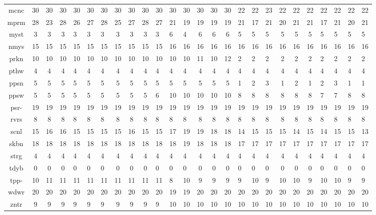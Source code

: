 \begin{center}
\begin{tabular}{|c|cccHHH|cccHHH|cccHHH|cccHHH|}
mcnc & 30 & 30 & 30 & 30 & 30 & 30 & 30 & 30 & 30 & 30 & 30 & 30 & 30 & 30 & 30 & 22 & 22 & 23 & 22 & 22 & 22 & 22 & 22 & 22 & 22\\
mprm & 28 & 23 & 28 & 26 & 27 & 28 & 25 & 27 & 28 & 27 & 21 & 19 & 19 & 19 & 19 & 21 & 17 & 21 & 20 & 21 & 21 & 17 & 21 & 20 & 21\\
myst & 3 & 3 & 3 & 3 & 3 & 3 & 3 & 3 & 3 & 3 & 6 & 4 & 6 & 6 & 6 & 5 & 5 & 5 & 5 & 5 & 5 & 5 & 5 & 5 & 5\\
nmys & 15 & 15 & 15 & 15 & 15 & 15 & 15 & 15 & 15 & 15 & 16 & 16 & 16 & 16 & 16 & 16 & 16 & 16 & 16 & 16 & 16 & 16 & 16 & 16 & 16\\
prkn & 10 & 10 & 10 & 10 & 10 & 10 & 10 & 10 & 10 & 10 & 10 & 10 & 11 & 10 & 12 & 2 & 2 & 2 & 2 & 2 & 2 & 2 & 2 & 2 & 2\\
pthw & 4 & 4 & 4 & 4 & 4 & 4 & 4 & 4 & 4 & 4 & 4 & 4 & 4 & 4 & 4 & 4 & 4 & 4 & 4 & 4 & 4 & 4 & 4 & 4 & 4\\
ppsn & 5 & 5 & 5 & 5 & 5 & 5 & 5 & 5 & 5 & 5 & 5 & 5 & 5 & 5 & 5 & 1 & 2 & 3 & 1 & 2 & 1 & 2 & 3 & 1 & 1\\
ppsw & 5 & 5 & 5 & 5 & 5 & 5 & 5 & 5 & 5 & 6 & 10 & 10 & 10 & 10 & 10 & 8 & 8 & 8 & 8 & 8 & 8 & 7 & 7 & 8 & 8\\
psr- & 19 & 19 & 19 & 19 & 19 & 19 & 19 & 19 & 19 & 19 & 19 & 19 & 19 & 19 & 19 & 19 & 19 & 19 & 19 & 19 & 19 & 19 & 19 & 19 & 19\\
rvrs & 8 & 8 & 8 & 8 & 8 & 8 & 8 & 8 & 8 & 8 & 8 & 8 & 8 & 8 & 8 & 8 & 8 & 8 & 8 & 8 & 8 & 8 & 8 & 8 & 8\\
scnl & 15 & 16 & 16 & 15 & 15 & 15 & 15 & 16 & 15 & 15 & 17 & 19 & 19 & 18 & 18 & 14 & 15 & 15 & 15 & 14 & 15 & 14 & 15 & 15 & 13\\
skbn & 18 & 18 & 18 & 18 & 18 & 18 & 18 & 18 & 18 & 18 & 18 & 19 & 18 & 18 & 18 & 17 & 17 & 17 & 17 & 17 & 17 & 17 & 17 & 17 & 17\\
strg & 4 & 4 & 4 & 4 & 4 & 4 & 4 & 4 & 4 & 4 & 4 & 4 & 4 & 4 & 4 & 4 & 4 & 4 & 4 & 4 & 4 & 4 & 4 & 4 & 4\\
tdyb & 0 & 0 & 0 & 0 & 0 & 0 & 0 & 0 & 0 & 0 & 0 & 0 & 0 & 0 & 0 & 0 & 0 & 0 & 0 & 0 & 0 & 0 & 0 & 0 & 0\\
tpp- & 10 & 11 & 11 & 11 & 11 & 11 & 11 & 11 & 11 & 11 & 8 & 10 & 9 & 9 & 9 & 9 & 10 & 9 & 10 & 10 & 9 & 10 & 10 & 9 & 9\\
wdwr & 20 & 20 & 20 & 20 & 20 & 20 & 20 & 20 & 20 & 20 & 19 & 19 & 20 & 20 & 20 & 20 & 20 & 20 & 20 & 20 & 20 & 20 & 20 & 20 & 20\\
zntr & 9 & 9 & 9 & 9 & 9 & 9 & 9 & 9 & 9 & 9 & 10 & 10 & 10 & 10 & 10 & 10 & 10 & 10 & 10 & 10 & 10 & 10 & 10 & 10 & 10\\
\end{tabular}
\end{center}
